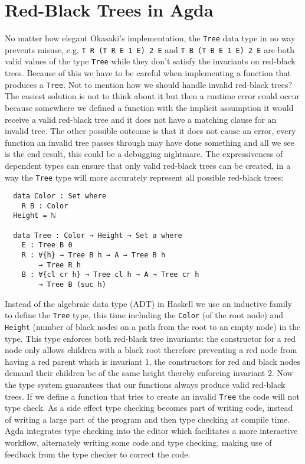 \documentclass[journal, retainorgcmds]{IEEEtran}
\newcommand{\iagda}[1]{\texttt{#1}}
\newcommand{\ihask}[1]{\texttt{#1}}
\begin{document}
\section{Red-Black Trees in Agda}

No matter how elegant Okasaki's implementation, the \ihask{Tree} data type
in no way prevents misuse, e.g. \ihask{T R (T R E 1 E) 2 E} and
\ihask{T B (T B E 1 E) 2 E} are both valid values of the type \ihask{Tree}
while they don't satisfy the invariants on red-black trees.
Because of this we have to be careful when implementing a function that
produces a \ihask{Tree}.
Not to mention how we should handle invalid red-black trees?
The easiest solution is not to think about it but then a runtime error could
occur because somewhere we defined a function with the implicit assumption it
would receive a valid red-black tree and it does not have a matching clause for
an invalid tree.
The other possible outcome is that it does not cause an error, every function
an invalid tree passes through may have done something and all we see is the
end result, this could be a debugging nightmare.
The expressiveness of dependent types can ensure that only valid red-black
trees can be created, in a way the \iagda{Tree} type will more accurately
represent all possible red-black trees:

\begin{verbatim}
  data Color : Set where
    R B : Color
  Height = ℕ

  data Tree : Color → Height → Set a where
    E : Tree B 0
    R : ∀{h} → Tree B h → A → Tree B h
        → Tree R h
    B : ∀{cl cr h} → Tree cl h → A → Tree cr h
        → Tree B (suc h)
\end{verbatim}

Instead of the algebraic data type (ADT) \cite{adt} in Haskell we use an
inductive family \cite{indfam} to define the \iagda{Tree} type, this time
including the \iagda{Color} (of the root node) and \iagda{Height} (number of
black nodes on a path from the root to an empty node) in the type.
This type enforces both red-black tree invariants: the constructor for a
red node only allows children with a black root therefore preventing a red
node from having a red parent which is invariant 1, the constructors for red
and black nodes demand their children be of the same height thereby enforcing
invariant 2.
Now the type system guarantees that our functions always produce valid
red-black trees.
If we define a function that tries to create an invalid \iagda{Tree} the code
will not type check.
As a side effect type checking becomes part of writing code, instead of writing
a large part of the program and then type checking at compile time.
Agda integrates type checking into the editor which facilitates a more
interactive workflow, alternately writing some code and type checking, making
use of feedback from the type checker to correct the code.
\end{document}
